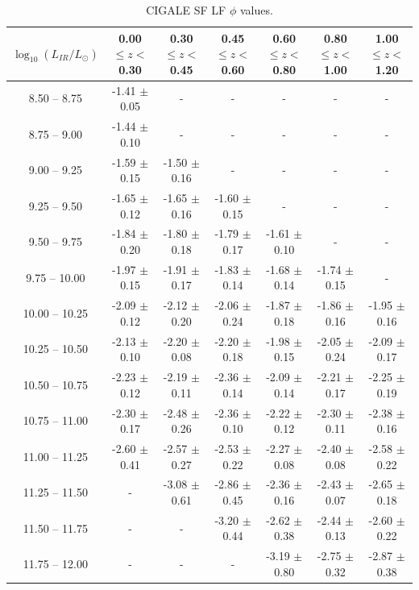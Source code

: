 \begin{table}
    \begin{center}
    \caption{CIGALE SF LF $\phi$ values.}
    \label{Tab: CG SF LF}
    \begin{tabular}{@{}ccccccc@{}}
        \toprule
        $\log_{10}(L_{IR}/L_{\odot})$ & 0.00 $\leq z <$ 0.30 & 0.30 $\leq z <$ 0.45 & 0.45 $\leq z <$ 0.60 & 0.60 $\leq z <$ 0.80 & 0.80 $\leq z <$ 1.00 & 1.00 $\leq z <$ 1.20 \\
        \hline
         8.50 --  8.75 & -1.41 $\pm$ 0.05 & - & - & - & - & - \\
         8.75 --  9.00 & -1.44 $\pm$ 0.10 & - & - & - & - & - \\
         9.00 --  9.25 & -1.59 $\pm$ 0.15 & -1.50 $\pm$ 0.16 & - & - & - & - \\
         9.25 --  9.50 & -1.65 $\pm$ 0.12 & -1.65 $\pm$ 0.16 & -1.60 $\pm$ 0.15 & - & - & - \\
         9.50 --  9.75 & -1.84 $\pm$ 0.20 & -1.80 $\pm$ 0.18 & -1.79 $\pm$ 0.17 & -1.61 $\pm$ 0.10 & - & - \\
         9.75 -- 10.00 & -1.97 $\pm$ 0.15 & -1.91 $\pm$ 0.17 & -1.83 $\pm$ 0.14 & -1.68 $\pm$ 0.14 & -1.74 $\pm$ 0.15 & - \\
        10.00 -- 10.25 & -2.09 $\pm$ 0.12 & -2.12 $\pm$ 0.20 & -2.06 $\pm$ 0.24 & -1.87 $\pm$ 0.18 & -1.86 $\pm$ 0.16 & -1.95 $\pm$ 0.16 \\
        10.25 -- 10.50 & -2.13 $\pm$ 0.10 & -2.20 $\pm$ 0.08 & -2.20 $\pm$ 0.18 & -1.98 $\pm$ 0.15 & -2.05 $\pm$ 0.24 & -2.09 $\pm$ 0.17 \\
        10.50 -- 10.75 & -2.23 $\pm$ 0.12 & -2.19 $\pm$ 0.11 & -2.36 $\pm$ 0.14 & -2.09 $\pm$ 0.14 & -2.21 $\pm$ 0.17 & -2.25 $\pm$ 0.19 \\
        10.75 -- 11.00 & -2.30 $\pm$ 0.17 & -2.48 $\pm$ 0.26 & -2.36 $\pm$ 0.10 & -2.22 $\pm$ 0.12 & -2.30 $\pm$ 0.11 & -2.38 $\pm$ 0.16 \\
        11.00 -- 11.25 & -2.60 $\pm$ 0.41 & -2.57 $\pm$ 0.27 & -2.53 $\pm$ 0.22 & -2.27 $\pm$ 0.08 & -2.40 $\pm$ 0.08 & -2.58 $\pm$ 0.22 \\
        11.25 -- 11.50 & -                & -3.08 $\pm$ 0.61 & -2.86 $\pm$ 0.45 & -2.36 $\pm$ 0.16 & -2.43 $\pm$ 0.07 & -2.65 $\pm$ 0.18 \\
        11.50 -- 11.75 & -                & -                & -3.20 $\pm$ 0.44 & -2.62 $\pm$ 0.38 & -2.44 $\pm$ 0.13 & -2.60 $\pm$ 0.22 \\
        11.75 -- 12.00 & -                & -                & -                & -3.19 $\pm$ 0.80 & -2.75 $\pm$ 0.32 & -2.87 $\pm$ 0.38 \\

\end{tabular}
\end{center}
\end{table}
